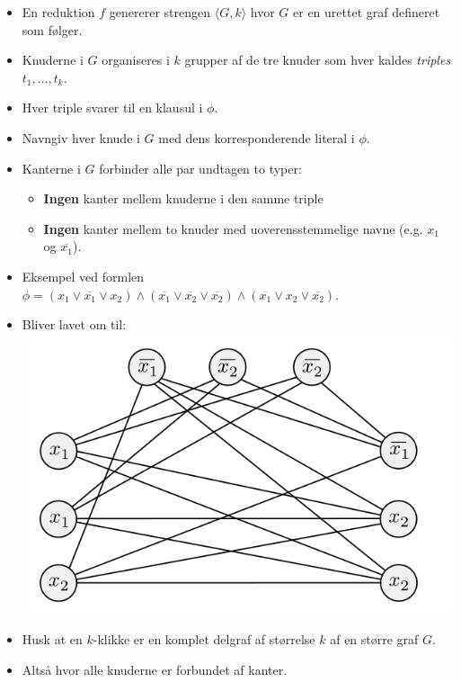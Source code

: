\begin{frame}[allowframebreaks]
\begin{itemize}
		\item En reduktion $f$ genererer strengen $\langle G, k \rangle$ hvor $G$ er en urettet graf defineret som følger.
		\item Knuderne i $G$ organiseres i $k$ grupper af de tre knuder som hver kaldes \textit{triples} $t_{1}, \ldots, t_{k}$.
		\item Hver triple svarer til en klausul i $\phi$.
		\item Navngiv hver knude i $G$ med dens korresponderende literal i $\phi$.
		\item Kanterne i $G$  forbinder alle par undtagen to typer:
		      \begin{itemize}
			      \item \textbf{Ingen} kanter mellem knuderne i den samme triple
			      \item \textbf{Ingen} kanter mellem to knuder med uoverensstemmelige navne (e.g. $x_{1}$ og $\overline{x_{1}}$).
		      \end{itemize}

		\item Eksempel ved formlen $\phi = (x_1 \lor \overline{x_1} \lor x_2) \land (\overline{x_1} \lor \overline{x_2} \lor \overline{x_2}) \land (\overline{x_1} \lor x_2 \lor \overline{x_2}).$

		\item Bliver lavet om til:
		      \includegraphics[scale=0.5]{figur/figur733.png}
		\item Husk at en $k$-klikke er en komplet delgraf af størrelse $k$ af en større graf $G$.
		\item Altså hvor alle knuderne er forbundet af kanter.
	\end{itemize}


\end{frame}
